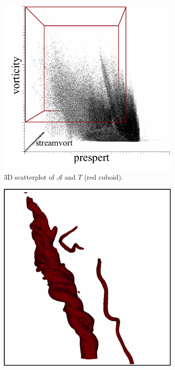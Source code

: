 \begin{figure}[!h]
\begin{subfigure}{0.17\linewidth}
\centering
\includegraphics[width=\linewidth]{Images/Tornado/scatterplot3d.pdf}
\vspace{-4mm}
\caption{3D scatterplot of $\mathcal{A}$ and $T$ (red cuboid).} 
\vspace{-2mm}
\label{fig:tornado_scatterplot}
\end{subfigure}
\hfill
\begin{subfigure}{0.20\linewidth}
\centering
\includegraphics[width=0.9\linewidth]{Images/Tornado/zls.pdf}

\end{subfigure}
\end{figure}
